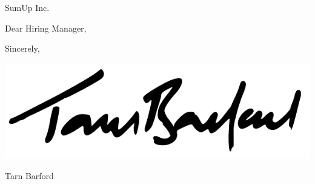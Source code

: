 \documentclass[12pt]{letter}
\begin{document}
  \begin{letter}{SumUp Inc.}

  \opening{Dear Hiring Manager,}

    \lipsum[1-3]

    \vspace{0.5em}

    Sincerely,
    \par
    \hspace{-1em}
    \includegraphics[height=2.5\baselineskip]{signature}
    \vspace{-1em}
    \par
    Tarn Barford

  \end{letter}
\end{document}
